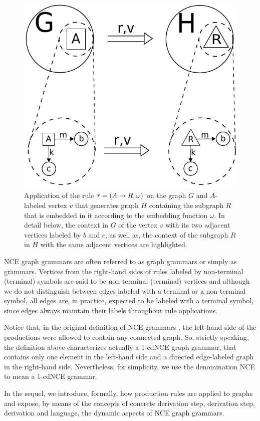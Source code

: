 \begin{figure}
	\centering
	\includegraphics[width=.5\textwidth]{figures/misc/rule-application}
	\caption{Application of the rule $r = (A \to R, \omega)$ on the graph $G$ and $A$-labeled vertex $v$ that generates graph $H$ containing the subgraph $R$ that is embedded in it according to the embedding function $\omega$. In detail below, the context in $G$ of the vertex $v$ with its two adjacent vertices labeled by $b$ and $c$, as well as, the context of the subgraph $R$ in $H$ with the same adjacent vertices are highlighted.}
	\label{fig:rule-application}
\end{figure}

NCE graph grammars are often referred to as graph grammars or simply as grammars. Vertices from the right-hand sides of rules labeled by non-terminal (terminal) symbols are said to be non-terminal (terminal) vertices and although we do not distinguish between edges labeled with a terminal or a non-terminal symbol, all edges are, in practice, expected to be labeled with a terminal symbol, since edges always maintain their labels throughout rule applications.

Notice that, in the original definition of NCE grammars \cite{janssens1982graph}, the left-hand side of the productions were allowed to contain any connected graph. So, strictly speaking, the definition above characterizes actually a 1-edNCE graph grammar, that contains only one element in the left-hand side and a directed edge-labeled graph in the right-hand side. Nevertheless, for simplicity, we use the denomination NCE to mean a 1-edNCE grammar.

In the sequel, we introduce, formally, how production rules are applied to graphs and expose, by means of the concepts of concrete derivation step, derivation step, derivation and language, the dynamic aspects of NCE graph grammars.

